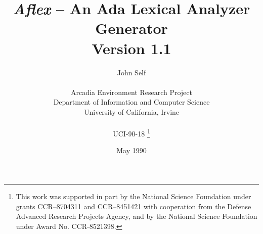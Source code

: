 \addtolength{\oddsidemargin}{0in}
\addtolength{\textwidth}{+0.5in}
\addtolength{\topmargin}{-0.5in}       %
\addtolength{\textheight}{0.5in}
\renewcommand{\topfraction}{0.95}
\renewcommand{\textfraction}{0.05}  %
\parindent 0pt


\newcommand{\mysk}{\vspace{0.5cm}}

\title{\vspace{2cm}\goodbreak 
\bf {\sl Aflex} \rm -- An Ada Lexical Analyzer Generator
\\ \vspace{1cm} Version 1.1 \vspace{1cm}
}
\author{\large \rm John Self \\
\ \\
Arcadia Environment Research Project \\
Department of Information and Computer Science\\
University of California, Irvine \\
\\UCI-90-18
\thanks{This work was supported in
part by the National Science Foundation under grants CCR--8704311
and CCR--8451421 with cooperation from the Defense Advanced Research
Projects Agency, and by the National Science Foundation under Award
No. CCR-8521398.}
}

\date{May 1990}

\maketitle



\begin{titlepage}
\tableofcontents
\end{titlepage}

